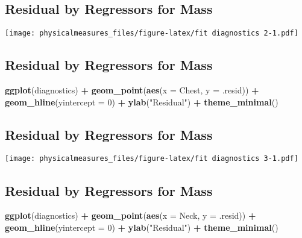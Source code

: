 \documentclass[]{article}
\newenvironment{Shaded}{\begin{snugshade}}{\end{snugshade}}
\newcommand{\KeywordTok}[1]{\textcolor[rgb]{0.13,0.29,0.53}{\textbf{#1}}}
\newcommand{\DataTypeTok}[1]{\textcolor[rgb]{0.13,0.29,0.53}{#1}}
\newcommand{\DecValTok}[1]{\textcolor[rgb]{0.00,0.00,0.81}{#1}}
\newcommand{\StringTok}[1]{\textcolor[rgb]{0.31,0.60,0.02}{#1}}
\newcommand{\OperatorTok}[1]{\textcolor[rgb]{0.81,0.36,0.00}{\textbf{#1}}}
\newcommand{\NormalTok}[1]{#1}
\begin{document}
\subsection{Residual by Regressors for
Mass}\label{residual-by-regressors-for-mass-3}

\texttt{[image: physicalmeasures\_files/figure-latex/fit diagnostics 2-1.pdf]}

\subsection{Residual by Regressors for
Mass}\label{residual-by-regressors-for-mass-4}

\begin{Shaded}
\begin{Highlighting}[]
\KeywordTok{ggplot}\NormalTok{(diagnostics) }\OperatorTok{+}
\StringTok{  }\KeywordTok{geom_point}\NormalTok{(}\KeywordTok{aes}\NormalTok{(}\DataTypeTok{x =}\NormalTok{ Chest, }\DataTypeTok{y =}\NormalTok{ .resid)) }\OperatorTok{+}
\StringTok{  }\KeywordTok{geom_hline}\NormalTok{(}\DataTypeTok{yintercept =} \DecValTok{0}\NormalTok{) }\OperatorTok{+}
\StringTok{  }\KeywordTok{ylab}\NormalTok{(}\StringTok{"Residual"}\NormalTok{) }\OperatorTok{+}
\StringTok{  }\KeywordTok{theme_minimal}\NormalTok{()}
\end{Highlighting}
\end{Shaded}

\subsection{Residual by Regressors for
Mass}\label{residual-by-regressors-for-mass-5}

\texttt{[image: physicalmeasures\_files/figure-latex/fit diagnostics 3-1.pdf]}

\subsection{Residual by Regressors for
Mass}\label{residual-by-regressors-for-mass-6}

\begin{Shaded}
\begin{Highlighting}[]
\KeywordTok{ggplot}\NormalTok{(diagnostics) }\OperatorTok{+}
\StringTok{  }\KeywordTok{geom_point}\NormalTok{(}\KeywordTok{aes}\NormalTok{(}\DataTypeTok{x =}\NormalTok{ Neck, }\DataTypeTok{y =}\NormalTok{ .resid)) }\OperatorTok{+}
\StringTok{  }\KeywordTok{geom_hline}\NormalTok{(}\DataTypeTok{yintercept =} \DecValTok{0}\NormalTok{) }\OperatorTok{+}
\StringTok{  }\KeywordTok{ylab}\NormalTok{(}\StringTok{"Residual"}\NormalTok{) }\OperatorTok{+}
\StringTok{  }\KeywordTok{theme_minimal}\NormalTok{()}
\end{Highlighting}
\end{Shaded}
\end{document}
